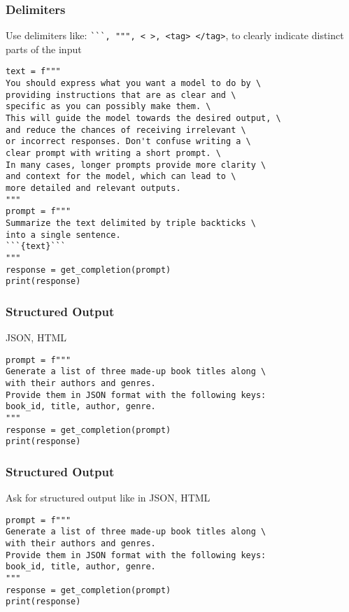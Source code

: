 \begin{frame}[fragile]\frametitle{Delimiters}

Use delimiters like: \lstinline|```, """, < >, <tag> </tag>|,  to clearly indicate distinct parts of the input

\begin{lstlisting}
text = f"""
You should express what you want a model to do by \ 
providing instructions that are as clear and \ 
specific as you can possibly make them. \ 
This will guide the model towards the desired output, \ 
and reduce the chances of receiving irrelevant \ 
or incorrect responses. Don't confuse writing a \ 
clear prompt with writing a short prompt. \ 
In many cases, longer prompts provide more clarity \ 
and context for the model, which can lead to \ 
more detailed and relevant outputs.
"""
prompt = f"""
Summarize the text delimited by triple backticks \ 
into a single sentence.
```{text}```
"""
response = get_completion(prompt)
print(response)
\end{lstlisting}
		
		
\end{frame}

\begin{frame}[fragile]\frametitle{Structured Output}

JSON, HTML

\begin{lstlisting}
prompt = f"""
Generate a list of three made-up book titles along \ 
with their authors and genres. 
Provide them in JSON format with the following keys: 
book_id, title, author, genre.
"""
response = get_completion(prompt)
print(response)
\end{lstlisting}
		
		
\end{frame}


\begin{frame}[fragile]\frametitle{Structured Output}

Ask for structured output like in JSON, HTML

\begin{lstlisting}
prompt = f"""
Generate a list of three made-up book titles along \ 
with their authors and genres. 
Provide them in JSON format with the following keys: 
book_id, title, author, genre.
"""
response = get_completion(prompt)
print(response)
\end{lstlisting}
		
		
\end{frame}


